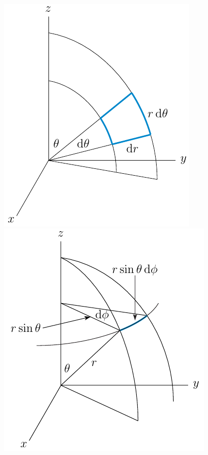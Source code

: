 \begin{wfig}
\begin{center}
    \includegraphics{spher6.pdf}\qquad
    \includegraphics{spher7.pdf}
\end{center}
\end{wfig}





